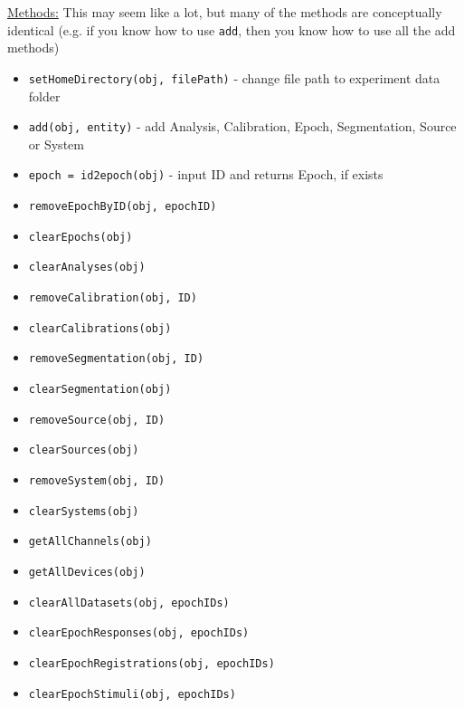 \documentclass[10pt]{exam}
\newcommand\aodfcn[1]{\textcolor{darkteal}{\texttt{#1}}}
\newcommand\docheader[1]{\vspace{0.6ex}\noindent\underline{#1}\vspace{0.15ex}}
\begin{document}
		\docheader{Methods:} This may seem like a lot, but many of the methods are conceptually identical (e.g. if you know how to use \aodfcn{add}, then you know how to use all the add methods)
		\begin{itemize}
			\item \aodfcn{setHomeDirectory(obj, filePath)} - change file path to experiment data folder
			\item \aodfcn{add(obj, entity)} - add Analysis, Calibration, Epoch, Segmentation, Source or System\\
			\item \aodfcn{epoch = id2epoch(obj)} - input ID and returns Epoch, if exists
			\item \aodfcn{removeEpochByID(obj, epochID)}
			\item \aodfcn{clearEpochs(obj)}\\
			\item \aodfcn{clearAnalyses(obj)}
			\item \aodfcn{removeCalibration(obj, ID)}
			\item \aodfcn{clearCalibrations(obj)}\\
			\item \aodfcn{removeSegmentation(obj, ID)}
			\item \aodfcn{clearSegmentation(obj)}\\
			\item \aodfcn{removeSource(obj, ID)}
			\item \aodfcn{clearSources(obj)}\\
			\item \aodfcn{removeSystem(obj, ID)}
			\item \aodfcn{clearSystems(obj)}
			\item \aodfcn{getAllChannels(obj)}
			\item \aodfcn{getAllDevices(obj)}\\
			\item \aodfcn{clearAllDatasets(obj, epochIDs)}
			\item \aodfcn{clearEpochResponses(obj, epochIDs)}
			\item \aodfcn{clearEpochRegistrations(obj, epochIDs)}
			\item \aodfcn{clearEpochStimuli(obj, epochIDs)}
		\end{itemize}
\end{document}
